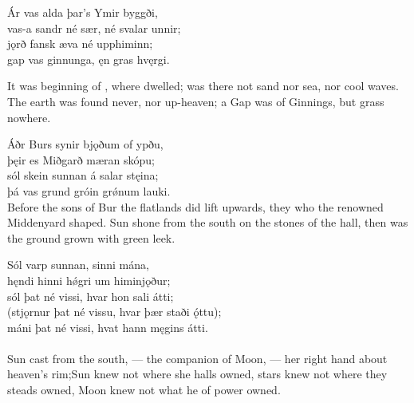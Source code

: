 \bva Ár vas alda \hld þar’s Ymir byggði,\footnotemark[6] \\%
vas-a sandr né sær, \hld né svalar unnir; \\%
jǫrð fansk æva \hld né upphiminn; \\%
gap vas ginnunga, \hld ęn gras hvęrgi. \\%

\bvb It was beginning of , where  dwelled\footnotemark[1]; was there not sand nor sea, nor cool waves. The earth was found never, nor up-heaven; a Gap was of Ginnings\footnotemark[2], but grass nowhere. 

\bva Áðr Burs synir \hld bjǫðum of ypðu, \\%
þęir es Miðgarð \hld mæran skópu; \\%
sól skein sunnan \hld á salar stęina; \\%
þá vas grund gróin \hld grǿnum lauki.\\%

\bvb Before the sons of Bur the flatlands did lift upwards, they who the renowned Middenyard shaped. Sun shone from the south on the stones of the hall, then was the ground grown with green leek.\footnotemark[1]

\bva Sól varp sunnan, \hld sinni mána,\footnotemark[10] \\%
hęndi hinni hǿgri \hld um himinjǫður; \\%
sól þat né vissi, \hld hvar hon sali átti; \\%
(stjǫrnur þat né vissu, \hld hvar þær staði ǫ́ttu); \\%
máni þat né vissi, \hld hvat hann męgins átti. \\%
\\%

\bvb Sun cast from the south, — the companion of Moon, — her right hand about heaven’s rim;\footnotemark[1] Sun knew not where she halls owned, stars knew not where they steads owned, Moon knew not what he of power owned.

